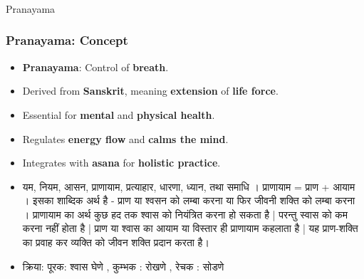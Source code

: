 \begin{frame}[fragile]\frametitle{}
\begin{center}
{\Large Pranayama}
\end{center}
\end{frame}

\begin{frame}[fragile]\frametitle{Pranayama: Concept}

      \begin{itemize}
        \item \textbf{Pranayama}: Control of \textbf{breath}.
        \item Derived from \textbf{Sanskrit}, meaning \textbf{extension} of \textbf{life force}.
        \item Essential for \textbf{mental} and \textbf{physical health}.
        \item Regulates \textbf{energy flow} and \textbf{calms the mind}.
        \item Integrates with \textbf{asana} for \textbf{holistic practice}.
		\item  यम, नियम, आसन, प्राणायाम, प्रत्याहार, धारणा, ध्यान, तथा समाधि । प्राणायाम = प्राण + आयाम । इसका शाब्दिक अर्थ है -  प्राण या श्वसन को लम्बा करना  या फिर   जीवनी शक्ति  को लम्बा करना । प्राणायाम का अर्थ कुछ हद तक श्वास को नियंत्रित करना हो सकता है | परन्तु स्वास को कम करना नहीं होता है | प्राण या श्वास का आयाम या विस्तार ही प्राणायाम कहलाता है | यह प्राण-शक्ति का प्रवाह कर व्यक्ति को जीवन शक्ति प्रदान करता है।
		\item क्रिया: पूरक: श्वास घेणे , कुम्भक : रोखणे , रेचक : सोडणे 

      \end{itemize}

\end{frame}

